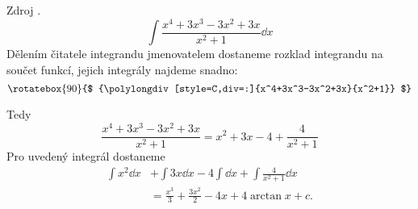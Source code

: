 \begin{mdframed}[style=mdexam]
  \begin{example}\label{MAI:exam121}
    Zdroj \cite[s.~29]{Knichal}.
    \begin{equation}\label{MA:int_ex_01}
      \int{\frac{x^4+3x^3-3x^2+3x}{x^2+1}\dd{x}}
    \end{equation}
    Dělením čitatele integrandu jmenovatelem  dostaneme rozklad integrandu na součet funkcí,
    jejich integrály najdeme snadno:
    \begin{equation*}
      \rotatebox{90}{$
        {\polylongdiv[style=C,div=:]{x^4+3x^3-3x^2+3x}{x^2+1}}
      $}
    \end{equation*}

    Tedy
    \begin{equation*}
      \frac{x^4+3x^3-3x^2+3x}{x^2+1} = x^2+3x-4+\frac{4}{x^2+1}  
    \end{equation*}
    Pro uvedený integrál dostaneme
    \begin{align*}
      \int{x^2}\dd{x} &+\int{3x}\dd{x}-4\int\dd{x}+\int{\frac{4}{x^2+1}\dd{x}} \\
                      &= \frac{x^3}{3}+\frac{3x^2}{2}-4x+4\arctan x + c.
    \end{align*}
  \end{example}
\end{mdframed}